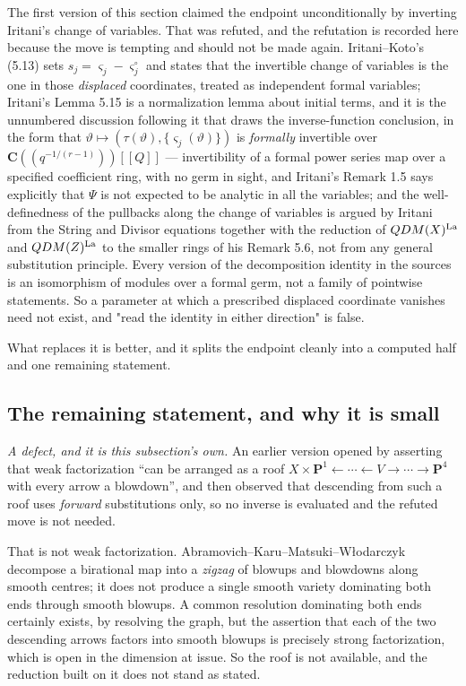 \documentclass[11pt]{article}
\theoremstyle{definition}
\theoremstyle{remark}
\newcommand{\C}{\mathbf C}
\newcommand{\PP}{\mathbf P}
\begin{document}
The first version of this section claimed the endpoint unconditionally by
inverting Iritani's change of variables. That was refuted, and the refutation is
recorded here because the move is tempting and should not be made again.
Iritani--Koto's (5.13) sets $s_j=\varsigma_j-\varsigma_j^\circ$ and states that
the invertible change of variables is the one in those \emph{displaced}
coordinates, treated as independent formal variables; Iritani's Lemma 5.15 is a
normalization lemma about initial terms, and it is the unnumbered discussion
following it that draws the inverse-function conclusion, in the form that
$\vartheta\mapsto(\tau(\vartheta),\{\varsigma_j(\vartheta)\})$ is
\emph{formally} invertible over $\C(\!(q^{-1/(r-1)})\!)[[Q]]$ --- invertibility
of a formal power series map over a specified coefficient ring, with no germ in
sight, and Iritani's Remark 1.5 says explicitly that $\Psi$ is not expected to be
analytic in all the variables; and the well-definedness of the pullbacks along
the change of variables is argued by Iritani from the String and Divisor
equations together with the reduction of $QDM(X)^{\rm La}$ and $QDM(Z)^{\rm La}$
to the smaller rings of his Remark 5.6, not from any general substitution
principle. Every version of the
decomposition identity in the sources is an isomorphism of modules over a formal
germ, not a family of pointwise statements. So a parameter at which a prescribed
displaced coordinate vanishes need not exist, and "read the identity in either
direction" is false.

What replaces it is better, and it splits the endpoint cleanly into a computed
half and one remaining statement.

\subsection*{The remaining statement, and why it is small}

\emph{A defect, and it is this subsection's own.} An earlier version opened by
asserting that weak factorization ``can be arranged as a roof
$X\times\PP^1\leftarrow\cdots\leftarrow V\rightarrow\cdots\rightarrow\PP^4$
with every arrow a blowdown'', and then observed that descending from such a roof
uses \emph{forward} substitutions only, so no inverse is evaluated and the
refuted move is not needed.

That is not weak factorization. Abramovich--Karu--Matsuki--W{\l}odarczyk
decompose a birational map into a \emph{zigzag} of blowups and blowdowns along
smooth centres; it does not produce a single smooth variety dominating both ends
through smooth blowups. A common resolution dominating both ends certainly
exists, by resolving the graph, but the assertion that each of the two
descending arrows factors into smooth blowups is precisely strong factorization,
which is open in the dimension at issue. So the roof is not available, and the
reduction built on it does not stand as stated.
\end{document}
